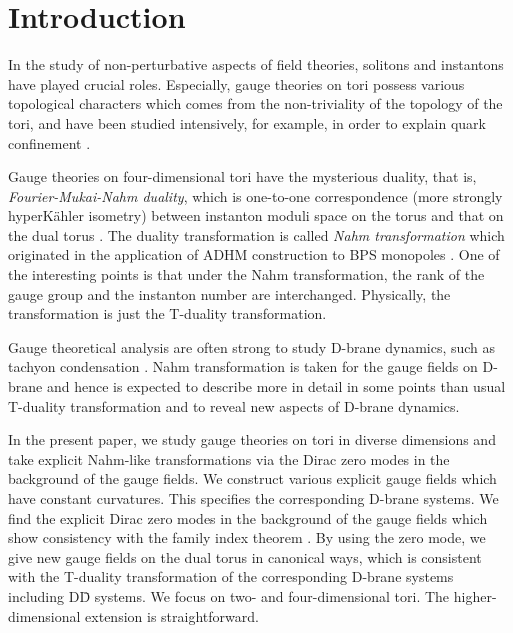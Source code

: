 \documentclass[a4paper,epsf,12pt]{article}
\providecommand{\Th}{\hat{T}}
\begin{document}
\baselineskip 6mm

\section{Introduction}

In the study of non-perturbative aspects of field theories,
solitons and instantons have played crucial roles.
Especially, gauge theories on tori possess various
topological characters which comes from the non-triviality
of the topology of the tori, 
and have been studied intensively,
for example,
in order to explain quark confinement \cite{tHooft, Gonzalez}.

Gauge theories on four-dimensional tori \coordHE{} have the mysterious duality,
that is, {\it Fourier-Mukai-Nahm duality},
which is one-to-one correspondence 
(more strongly hyperK\"ahler isometry) %
between instanton moduli space on the torus \coordHE{} and
that on the dual torus \myHighlight{$\Th^4$}\coordHE{} \cite{Mukai, Schenk, BvB, DoKr}.
The duality transformation is called {\it Nahm transformation}
which originated in the application of ADHM construction \cite{ADHM}
to BPS monopoles \cite{Nahm}.
One of the interesting points is that
under the Nahm transformation, 
the rank of the gauge group and
the instanton number %
are interchanged.
Physically, the transformation is just the T-duality transformation. 

Gauge theoretical analysis are often strong to
study D-brane dynamics, such as tachyon condensation \cite{Harvey}.
Nahm transformation is taken for the gauge fields on D-brane
and hence is expected to describe more in detail in some points
than usual T-duality transformation
and to reveal new aspects of D-brane dynamics.

In the present paper, we study gauge theories on tori
in diverse dimensions and take explicit Nahm-like transformations
via the Dirac zero modes in the background of the gauge fields.
We construct various explicit gauge fields which have
constant curvatures.
This specifies the corresponding D-brane systems. %
We find the explicit Dirac zero modes in the background
of the gauge fields which show consistency
with the family index theorem \cite{AtSi}.
By using the zero mode,
we give new gauge fields on the dual torus in canonical ways,
which is consistent with the T-duality
transformation of the corresponding D-brane systems
including D\=D systems.
We focus on two- and four-dimensional tori.
The higher-dimensional extension is straightforward. %
\end{document}
